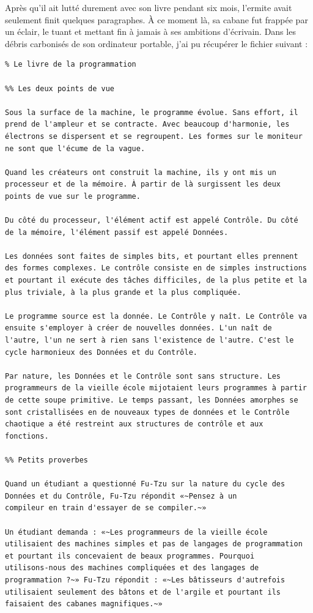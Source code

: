 \documentclass{FramateX}
\begin{document}
Après qu'il ait lutté durement avec son livre pendant six mois, l'ermite
avait seulement finit quelques paragraphes. À ce moment là, sa cabane
fut frappée par un éclair, le tuant et mettant fin à jamais à ses
ambitions d'écrivain. Dans les débris carbonisés de son ordinateur
portable, j'ai pu récupérer le fichier suivant :

\begin{lstlisting}
% Le livre de la programmation

%% Les deux points de vue

Sous la surface de la machine, le programme évolue. Sans effort, il
prend de l'ampleur et se contracte. Avec beaucoup d'harmonie, les
électrons se dispersent et se regroupent. Les formes sur le moniteur
ne sont que l'écume de la vague.

Quand les créateurs ont construit la machine, ils y ont mis un
processeur et de la mémoire. À partir de là surgissent les deux
points de vue sur le programme.

Du côté du processeur, l'élément actif est appelé Contrôle. Du côté
de la mémoire, l'élément passif est appelé Données.

Les données sont faites de simples bits, et pourtant elles prennent
des formes complexes. Le contrôle consiste en de simples instructions
et pourtant il exécute des tâches difficiles, de la plus petite et la
plus triviale, à la plus grande et la plus compliquée.

Le programme source est la donnée. Le Contrôle y naît. Le Contrôle va
ensuite s'employer à créer de nouvelles données. L'un naît de
l'autre, l'un ne sert à rien sans l'existence de l'autre. C'est le
cycle harmonieux des Données et du Contrôle.

Par nature, les Données et le Contrôle sont sans structure. Les
programmeurs de la vieille école mijotaient leurs programmes à partir
de cette soupe primitive. Le temps passant, les Données amorphes se
sont cristallisées en de nouveaux types de données et le Contrôle
chaotique a été restreint aux structures de contrôle et aux
fonctions.

%% Petits proverbes

Quand un étudiant a questionné Fu-Tzu sur la nature du cycle des
Données et du Contrôle, Fu-Tzu répondit «~Pensez à un
compileur en train d'essayer de se compiler.~»

Un étudiant demanda : «~Les programmeurs de la vieille école
utilisaient des machines simples et pas de langages de programmation
et pourtant ils concevaient de beaux programmes. Pourquoi
utilisons-nous des machines compliquées et des langages de
programmation ?~» Fu-Tzu répondit : «~Les bâtisseurs d'autrefois
utilisaient seulement des bâtons et de l'argile et pourtant ils
faisaient des cabanes magnifiques.~»


\end{lstlisting}
\end{document}
